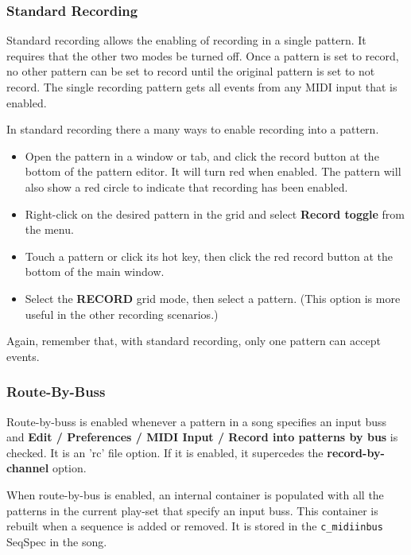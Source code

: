 \subsubsection{Standard Recording}
\label{subsubsec:recording_standard_recording}

   Standard recording allows the enabling of recording in a single pattern.
   It requires that the other two modes be turned off.
   Once a pattern is set to record, no other pattern can be set to record until
   the original pattern is set to not record.
   The single recording pattern gets all events from any MIDI
   input that is enabled.

   In standard recording there a many ways to enable recording into
   a pattern.

   \begin{itemize}
      \item Open the pattern in a window or tab, and click the record
         button at the bottom of the pattern editor.
         It will turn red when enabled. The pattern will also
         show a red circle to indicate that recording has been enabled.
      \item Right-click on the desired pattern in the grid and select
         \textbf{Record toggle} from the menu.
      \item Touch a pattern or click its hot key, then
         click the red record button at the bottom of the main window.
      \item Select the \textbf{RECORD} grid mode, then select a pattern.
         (This option is more useful in the other recording scenarios.)
   \end{itemize}

   Again, remember that, with standard recording, only one pattern can
   accept events.

\subsubsection{Route-By-Buss}
\label{subsubsec:recording_route_by_buss}

   Route-by-buss is enabled whenever a pattern in a song specifies an
   input buss and
   \textbf{Edit / Preferences / MIDI Input / Record into patterns by
   bus} is checked. It is an 'rc' file option.
   If it is enabled, it supercedes the
   \textbf{record-by-channel} option.

   When route-by-bus is enabled, an internal container is populated with
   all the patterns in the current play-set that specify an input buss.
   This container is rebuilt when a sequence is added or removed.
   It is stored in the \texttt{c\_midiinbus} SeqSpec in the song.

